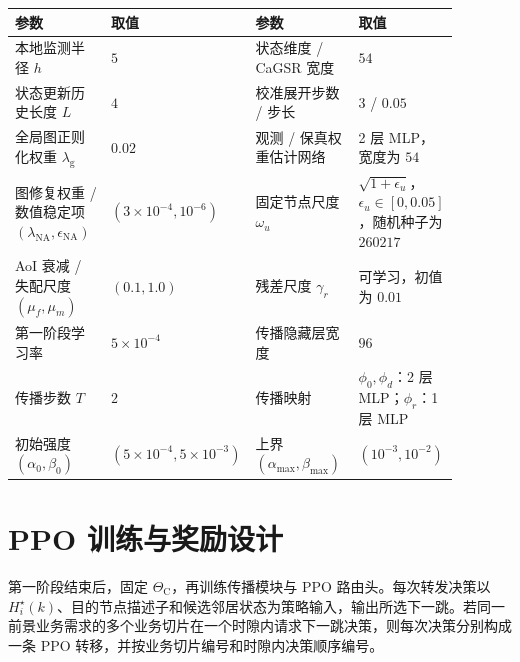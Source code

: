 \begin{table}[!htp]
    \centering
    \label{tab:app_ch3_caldp_hyperparams}
    \footnotesize
    \setlength{\tabcolsep}{4pt}
    \renewcommand{\arraystretch}{1.14}
    \begin{tabular}{p{0.25\linewidth} p{0.19\linewidth} p{0.25\linewidth} p{0.19\linewidth}}
        \hline
        参数 & 取值 & 参数 & 取值 \\
        \hline
        本地监测半径 $h$ & $5$ & 状态维度 / CaGSR 宽度 & $54$ \\
        状态更新历史长度 $L$ & $4$ & 校准展开步数 / 步长 & $3$ / $0.05$ \\
        全局图正则化权重 $\lambda_{\mathrm g}$ & $0.02$ & 观测 / 保真权重估计网络 & 2 层 MLP，宽度为 $54$ \\
        图修复权重 / 数值稳定项 $(\lambda_{\mathrm{NA}},\epsilon_{\mathrm{NA}})$ & $(3\times10^{-4},10^{-6})$ & 固定节点尺度 $\omega_u$ & $\sqrt{1+\epsilon_u}$，$\epsilon_u\in[0,0.05]$，随机种子为 $260217$ \\
        AoI 衰减 / 失配尺度 $(\mu_f,\mu_m)$ & $(0.1,1.0)$ & 残差尺度 $\gamma_r$ & 可学习，初值为 $0.01$ \\
        第一阶段学习率 & $5\times10^{-4}$ & 传播隐藏层宽度 & $96$ \\
        传播步数 $T$ & $2$ & 传播映射 & $\phi_0,\phi_d$：2 层 MLP；$\phi_r$：1 层 MLP \\
        初始强度 $(\alpha_0,\beta_0)$ & $(5\times10^{-4},5\times10^{-3})$ & 上界 $(\alpha_{\max},\beta_{\max})$ & $(10^{-3},10^{-2})$ \\
        \hline
    \end{tabular}
\end{table}

\section{PPO 训练与奖励设计}

第一阶段结束后，固定 $\Theta_{\mathrm C}$，再训练传播模块与 PPO 路由头。每次转发决策以 $H_i^\star(k)$、目的节点描述子和候选邻居状态为策略输入，输出所选下一跳。若同一前景业务需求的多个业务切片在一个时隙内请求下一跳决策，则每次决策分别构成一条 PPO 转移，并按业务切片编号和时隙内决策顺序编号。


